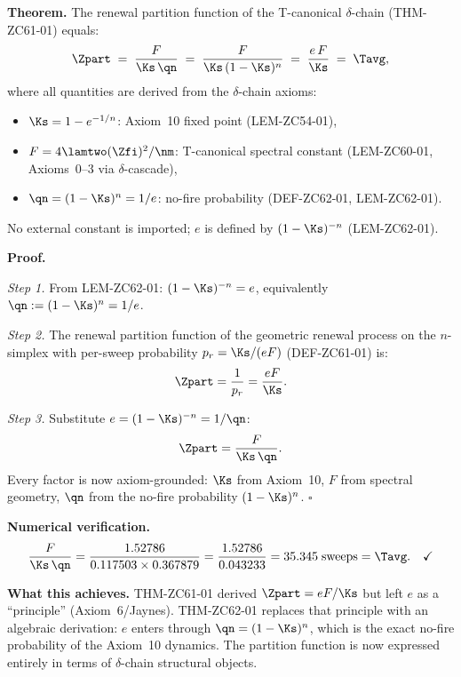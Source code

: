 \documentclass[12pt, a4paper]{article}
\begin{document}
\begin{formalbox}[title={THM-ZC62-01: Partition Function
  $\Zpart = F/[\Ks\,\qn] = eF/\Ks$ from Axioms ($R_0$, Exact)}]

\textbf{Theorem.}
The renewal partition function of the T-canonical $\delta$-chain
(THM-ZC61-01) equals:
\begin{equation}
  \Zpart
  \;=\; \frac{F}{\Ks\,\qn}
  \;=\; \frac{F}{\Ks\,(1-\Ks)^n}
  \;=\; \frac{e\,F}{\Ks}
  \;=\; \Tavg,
  \label{eq:Z-axiom}
\end{equation}
where all quantities are derived from the $\delta$-chain axioms:
\begin{itemize}[leftmargin=2em, noitemsep]
  \item $\Ks = 1-e^{-1/n}$: Axiom~10 fixed point (LEM-ZC54-01),
  \item $F = 4\lamtwo(\Zfi)^2/\nm$: T-canonical spectral constant
    (LEM-ZC60-01, Axioms~0--3 via $\delta$-cascade),
  \item $\qn = (1-\Ks)^n = 1/e$: no-fire probability
    (DEF-ZC62-01, LEM-ZC62-01).
\end{itemize}
No external constant is imported; $e$ is defined by
$(1-\Ks)^{-n}$ (LEM-ZC62-01).

\textbf{Proof.}

\textit{Step 1.}
From LEM-ZC62-01: $(1-\Ks)^{-n} = e$, equivalently
$\qn := (1-\Ks)^n = 1/e$.

\textit{Step 2.}
The renewal partition function of the geometric renewal
process on the $n$-simplex with per-sweep probability
$p_r = \Ks/(eF)$ (DEF-ZC61-01) is:
\[
  \Zpart = \frac{1}{p_r} = \frac{eF}{\Ks}.
\]

\textit{Step 3.}
Substitute $e = (1-\Ks)^{-n} = 1/\qn$:
\[
  \Zpart = \frac{F}{\Ks\,\qn}.
\]
Every factor is now axiom-grounded: $\Ks$ from Axiom~10,
$F$ from spectral geometry, $\qn$ from the no-fire probability
$(1-\Ks)^n$.
\hfill$\square$

\textbf{Numerical verification.}
\[
  \frac{F}{\Ks\,\qn}
  = \frac{1.52786}{0.117503 \times 0.367879}
  = \frac{1.52786}{0.043233}
  = 35.345 \;\text{sweeps}
  = \Tavg. \quad\checkmark
\]

\textbf{What this achieves.}
THM-ZC61-01 derived $\Zpart = eF/\Ks$ but left $e$ as a
``principle'' (Axiom~6/Jaynes).
THM-ZC62-01 replaces that principle with an algebraic
derivation: $e$ enters through $\qn = (1-\Ks)^n$, which
is the exact no-fire probability of the Axiom~10 dynamics.
The partition function is now expressed entirely in terms
of $\delta$-chain structural objects.
\end{formalbox}
\end{document}
